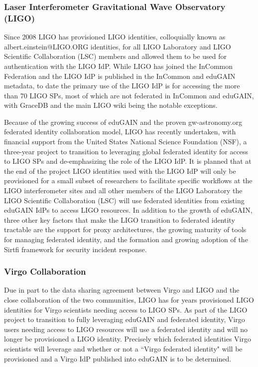 \documentclass[fleqn,10pt]{wlscirep}
\begin{document}
{\subsubsection{Laser Interferometer Gravitational Wave Observatory (LIGO)}
Since 2008 LIGO has provisioned LIGO identities, colloquially known as albert.einstein@LIGO.ORG identities, for all LIGO Laboratory and LIGO Scientific Collaboration (LSC) members and allowed them to be used for authentication with the LIGO IdP. While LIGO has joined the InCommon Federation and the LIGO IdP is published in the InCommon and eduGAIN metadata, to date the primary use of the LIGO IdP is for accessing the more than 70 LIGO SPs, most of which are not federated in InCommon and eduGAIN, with GraceDB and the main LIGO wiki being the notable exceptions.

Because of the growing success of eduGAIN and the proven gw-astronomy.org federated identity collaboration model, LIGO has recently undertaken, with financial support from the United States National Science Foundation (NSF), a three-year project to transition to leveraging global federated identity for access to LIGO SPs and de-emphasizing the role of the LIGO IdP. It is planned that at the end of the project LIGO identities used with the LIGO IdP will only be provisioned for a small subset of researchers to facilitate specific workflows at the LIGO interferometer sites and all other members of the LIGO Laboratory the LIGO Scientific Collaboration (LSC) will use federated identities from existing eduGAIN IdPs to access LIGO resources. In addition to the growth of eduGAIN, three other key factors that make the LIGO transition to federated identity tractable are the support for proxy architectures, the growing maturity of tools for managing federated identity, and the formation and growing adoption of the Sirtfi framework for security incident response.


\subsubsection{Virgo Collaboration}
Due in part to the data sharing agreement between Virgo and LIGO and the close collaboration of the two communities, LIGO has for years provisioned LIGO identities for Virgo scientists needing access to LIGO SPs. As part of the LIGO project to transition to fully leveraging eduGAIN and federated identity, Virgo users needing access to LIGO resources will use a federated identity and will no longer be provisioned a LIGO identity. Precisely which federated identities Virgo scientists will leverage and whether or not a ``Virgo federated identity" will be provisioned and a Virgo IdP published into eduGAIN is to be determined.


}
\end{document}
